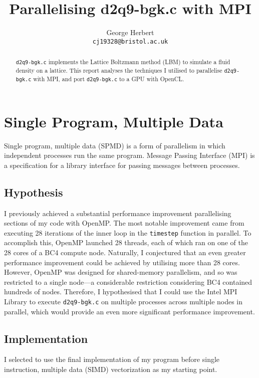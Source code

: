 \documentclass[twocolumn, a4paper]{article}
\author{
  George Herbert\\
  \texttt{cj19328@bristol.ac.uk}
}
\title{\vspace{-2em}Parallelising d2q9-bgk.c with MPI}
\begin{document}
\maketitle

\begin{abstract}
  \texttt{d2q9-bgk.c} implements the Lattice Boltzmann method (LBM) to simulate a fluid density on a lattice.
  This report analyses the techniques I utilised to parallelise \texttt{d2q9-bgk.c} with MPI, and port \texttt{d2q9-bgk.c} to a GPU with OpenCL.
\end{abstract}

\section{Single Program, Multiple Data}

Single program, multiple data (SPMD) is a form of parallelism in which independent processes run the same program.
Message Passing Interface (MPI) is a specification for a library interface for passing messages between processes.

\subsection{Hypothesis}

I previously achieved a substantial performance improvement parallelising sections of my code with OpenMP.
The most notable improvement came from executing 28 iterations of the inner loop in the \texttt{timestep} function in parallel.
To accomplish this, OpenMP launched 28 threads, each of which ran on one of the 28 cores of a BC4 compute node.
Naturally, I conjectured that an even greater performance improvement could be achieved by utilising more than 28 cores.
However, OpenMP was designed for shared-memory parallelism, and so was restricted to a single node---a considerable restriction considering BC4 contained hundreds of nodes.
Therefore, I hypothesised that I could use the Intel MPI Library to execute \texttt{d2q9-bgk.c} on multiple processes across multiple nodes in parallel, which would provide an even more significant performance improvement.

\subsection{Implementation}

I selected to use the final implementation of my program before single instruction, multiple data (SIMD) vectorization as my starting point.
\end{document}

